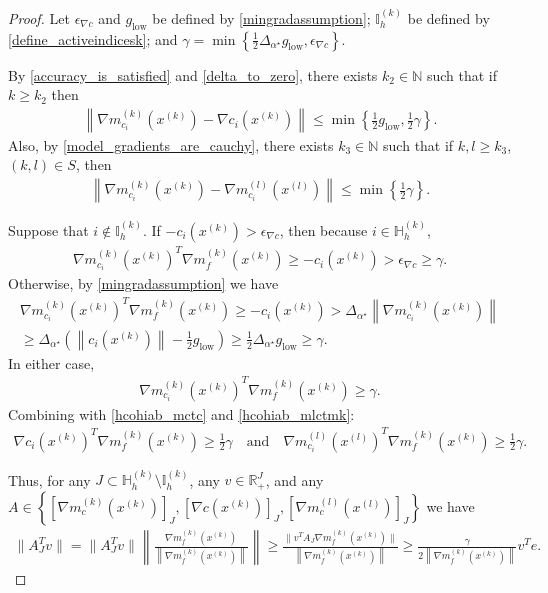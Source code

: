 \documentclass{article}
\theoremstyle{case}
\numberwithin{theorem}{subsection}
\newcommand{\gk}{{\nabla m_f^{(k)}\left(\xk\right)}}
\newcommand{\gmcik}{{\nabla m_{c_i}^{(k)}\left(\xk\right)}}
\newcommand{\gmcil}{{\nabla m_{c_i}^{(l)}\left(\xl\right)}}
\newcommand{\minangledelta}{{\Delta_{\alpha^{\star}}}}
\newcommand{\mingradepsilon}{{\epsilon_{\nabla c}}}
\newcommand{\mingrad}{{ g_{\textrm{low}} }}
\newcommand{\naturals}{\mathbb N}
\newcommand{\xk}{x^{(k)}}
\newcommand{\xl}{{x^{(l)}}}
\newcommand{\activeindicesk}{{ \mathbb I_h^{(k)} }}
\newcommand{\huffindicesk}{{ \mathbb H_h^{(k)} }}
\newcommand{\modeljack}{{ \nabla m^{(k)}_{c}\left(\xk\right) }}
\newcommand{\modeljacl}{{ \nabla m^{(l)}_{c}\left(\xl\right) }}
\newcommand{\truejack}{{ \nabla c\left(\xk\right) }}
\begin{document}
\begin{proof}
Let $\mingradepsilon$ and $\mingrad$ be defined by \cref{mingradassumption};
$\activeindicesk$ be defined by \cref{define_activeindicesk};
and $\gamma = \min\left\{\frac 1 2 \minangledelta \mingrad, \mingradepsilon\right\}$.



By \cref{accuracy_is_satisfied} and \cref{delta_to_zero}, there exists $k_2 \in \naturals$ such that if $k \ge k_2$ then
\begin{align}
\label{hcohiab_mctc}
\left\|\gmcik - \nabla c_i\left(\xk\right) \right\| \le \min\left\{\frac 1 2 \mingrad, \frac 1 2 \gamma\right\}.
\end{align}
Also, by \cref{model_gradients_are_cauchy}, there exists $k_3 \in \naturals$ such that if $k, l \ge k_3$, $(k, l) \in S$, then
\begin{align}
\label{hcohiab_mlctmk}
\left\|\gmcik - \gmcil \right\| \le \min\left\{\frac 1 2 \gamma\right\}.
\end{align}




Suppose that $i \not \in \activeindicesk$.
If $-c_i\left(\xk\right) > \mingradepsilon$, then because $i \in \huffindicesk$, 
\begin{align*}
\gmcik^T\gk \ge -c_i\left(\xk\right) > \mingradepsilon \ge \gamma.
\end{align*}
Otherwise, by \cref{mingradassumption} we have
\begin{align*}
\gmcik^T\gk \ge -c_i\left(\xk\right) > \minangledelta \left\|\gmcik\right\| \\
\ge \minangledelta\left(\left\|c_i\left(\xk\right)\right\| - \frac 1 2 \mingrad \right)
\ge  \frac 1 2 \minangledelta \mingrad \ge \gamma.
\end{align*}
In either case,
\begin{align*}
\gmcik^T\gk \ge \gamma.
\end{align*}
Combining with \cref{hcohiab_mctc} and \cref{hcohiab_mlctmk}:
\begin{align*}
\nabla c_i\left(\xk\right)^T\gk \ge \frac 1 2 \gamma
\quad \textrm{and} \quad 
\gmcil^T\gk \ge \frac 1 2 \gamma.
\end{align*}


Thus, for any $J \subset \huffindicesk \setminus \activeindicesk$, any $v \in \mathbb R^{J}_+$, and any $A \in \left\{
\left[\modeljack\right]_{J},
\left[\truejack\right]_{J},
\left[\modeljacl\right]_{J}
\right\}$ we have
\begin{align*}
\|A_J^Tv\| 
= \|A_J^Tv\| \left\|\frac{\gk}{\left\|\gk\right\|} \right\| 
\ge \frac{\|v^TA_J \gk\|}{\left\|\gk\right\|} \ge \frac {\gamma} {2\left\|\gk\right\|}  v^Te.
\end{align*}


\end{proof}
\end{document}
